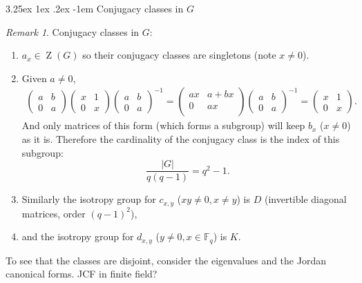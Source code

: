 \documentclass[12pt, letterpaper]{article}
\makeatletter
\newcommand{\field}{\mathbb{F}}
\newcommand{\ZZ}{\operatorname{Z}}
\newcommand{\red}[1]{{\color{red} #1}}
\newcommand{\card}[1]{\left\lvert #1 \right\rvert}
\renewcommand\paragraph{\@startsection{paragraph}{4}{\z@}%
	{3.25ex \@plus1ex \@minus.2ex}%
	{-1em}%
	{\normalfont\normalsize\bfseries}}
\theoremstyle{definition}
\theoremstyle{remark}
\newtheorem*{rem*}{Remark}
\theoremstyle{definition}
\theoremstyle{plain}
\numberwithin{equation}{section}
\makeatother
\begin{document}
	\paragraph{Conjugacy classes in $G$}
	\begin{rem*}
		Conjugacy classes in $G$:
		\begin{enumerate}
			\item 
			$a_x\in\ZZ(G)$ so their conjugacy classes are singletons (note $x\ne0$).
			
			\item
			Given $a\ne0$,
			\[
			\begin{aligned}
				\begin{pmatrix}
					a&b\\0&a
				\end{pmatrix}\begin{pmatrix}
					x&1\\0&x
				\end{pmatrix}
				\begin{pmatrix}
					a&b\\0&a
				\end{pmatrix}^{-1}=\begin{pmatrix}
					ax&a+bx\\
					0&ax\\
				\end{pmatrix}
				\begin{pmatrix}
					a&b\\0&a
				\end{pmatrix}^{-1}=\begin{pmatrix}
					x&1\\0&x
				\end{pmatrix}.
			\end{aligned}
			\]
			And only matrices of this form (which forms a subgroup)
			will keep $b_x$ ($x\ne0$) as it is.
			Therefore the cardinality of the conjugacy class is the index of this subgroup:
			\[ \frac{\card{G}}{q(q-1)}=q^2-1. \]
			
			\item  Similarly the isotropy group for $c_{x,y}$ ($xy\ne0,x\ne y$) is $D$ (invertible diagonal matrices,
			order $(q-1)^2$), 
			\item and the isotropy 
			group for $d_{x,y}$ ($y\ne0,x\in\field_q$) is $K$.
		\end{enumerate}
	
	\red{ To see that the classes are disjoint, consider the eigenvalues 
		and the Jordan canonical forms. JCF in finite field?} 
		
	\end{rem*}
\end{document}
